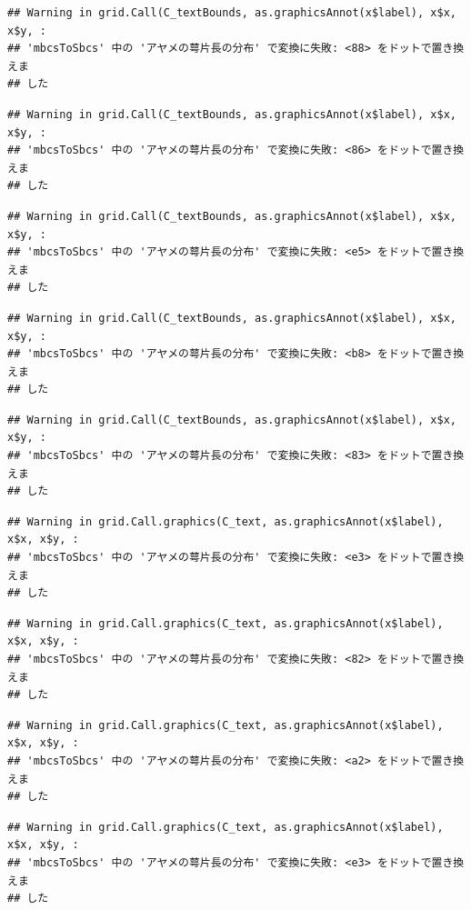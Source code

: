 \documentclass[
]{book}
\begin{document}
\begin{verbatim}
## Warning in grid.Call(C_textBounds, as.graphicsAnnot(x$label), x$x, x$y, :
## 'mbcsToSbcs' 中の 'アヤメの萼片長の分布' で変換に失敗: <88> をドットで置き換えま
## した
\end{verbatim}

\begin{verbatim}
## Warning in grid.Call(C_textBounds, as.graphicsAnnot(x$label), x$x, x$y, :
## 'mbcsToSbcs' 中の 'アヤメの萼片長の分布' で変換に失敗: <86> をドットで置き換えま
## した
\end{verbatim}

\begin{verbatim}
## Warning in grid.Call(C_textBounds, as.graphicsAnnot(x$label), x$x, x$y, :
## 'mbcsToSbcs' 中の 'アヤメの萼片長の分布' で変換に失敗: <e5> をドットで置き換えま
## した
\end{verbatim}

\begin{verbatim}
## Warning in grid.Call(C_textBounds, as.graphicsAnnot(x$label), x$x, x$y, :
## 'mbcsToSbcs' 中の 'アヤメの萼片長の分布' で変換に失敗: <b8> をドットで置き換えま
## した
\end{verbatim}

\begin{verbatim}
## Warning in grid.Call(C_textBounds, as.graphicsAnnot(x$label), x$x, x$y, :
## 'mbcsToSbcs' 中の 'アヤメの萼片長の分布' で変換に失敗: <83> をドットで置き換えま
## した
\end{verbatim}

\begin{verbatim}
## Warning in grid.Call.graphics(C_text, as.graphicsAnnot(x$label), x$x, x$y, :
## 'mbcsToSbcs' 中の 'アヤメの萼片長の分布' で変換に失敗: <e3> をドットで置き換えま
## した
\end{verbatim}

\begin{verbatim}
## Warning in grid.Call.graphics(C_text, as.graphicsAnnot(x$label), x$x, x$y, :
## 'mbcsToSbcs' 中の 'アヤメの萼片長の分布' で変換に失敗: <82> をドットで置き換えま
## した
\end{verbatim}

\begin{verbatim}
## Warning in grid.Call.graphics(C_text, as.graphicsAnnot(x$label), x$x, x$y, :
## 'mbcsToSbcs' 中の 'アヤメの萼片長の分布' で変換に失敗: <a2> をドットで置き換えま
## した
\end{verbatim}

\begin{verbatim}
## Warning in grid.Call.graphics(C_text, as.graphicsAnnot(x$label), x$x, x$y, :
## 'mbcsToSbcs' 中の 'アヤメの萼片長の分布' で変換に失敗: <e3> をドットで置き換えま
## した
\end{verbatim}
\end{document}
